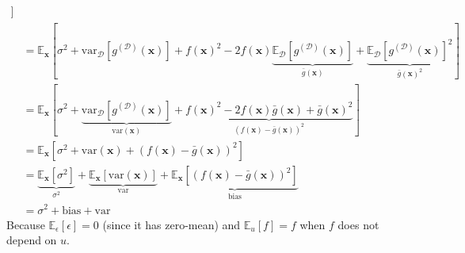\documentclass[12pt]{article}
\newcommand{\Data}{\mathcal{D}}
\newcommand{\Expect}{\mathbb{E}}
\newcommand{\Bias}{\bm{\mathrm{bias}}}
\newcommand{\Var}{\bm{\mathrm{var}}}
\newcommand{\myvec}[1]{\mathbf{#1}}
\newcommand{\X}{\myvec{x}}
\newcommand{\gD}{g^{(\Data)}}
\begin{document}
\begin{enumerate}
\begin{align*}
    [
    \underbrace{\Expect_{\Data}[f(\X)^{2}]}_{f(\X)^{2}}
    +
    \underbrace{\Expect_{\Data}[\sigma^{2}]}_{\sigma^{2}}
    +
    \underbrace{\Expect_{\Data}[\gD(\X)^{2}]}
    _{\substack{\Var_{\Data}[\gD(\X)] \\[0.5ex] + \\[0.5ex] \Expect_{\Data}[\gD(\X)]^{2}}}
    -
        \underbrace{\Expect_{\Data}[2f(\X)]}_{2f(\X)}
            \cdot
        \Expect_{\Data}[\gD(\X)]
    ]
    \\
    &= \Expect_{\X}
    [
    \sigma^{2} + \Var_{\Data}[\gD(\X)]
    + f(\X)^{2} - 2f(\X)\underbrace{\Expect_{\Data}[\gD(\X)]}_{\bar{g}(\X)} + \underbrace{\Expect_{\Data}[\gD(\X)]^{2}}_{\bar{g}(\X)^{2}}
    ]
    \\
    &= \Expect_{\X}
    [
    \sigma^{2} + \underbrace{\Var_{\Data}[\gD(\X)]}_{\Var(\X)}
    + 
    \underbrace
    {f(\X)^{2} - 2f(\X)\bar{g}(\X) + \bar{g}(\X)^{2}}
    _{( f(\X) - \bar{g}(\X))^{2}}
    ]
    \\
    &= \Expect_{\X}
    [
    \sigma^{2} + \Var(\X) + (f(\X) - \bar{g}(\X))^{2}
    ]
    \\
    &=
    \underbrace
    {\Expect_{\X}[\sigma^{2}]}_{\sigma^{2}}
    +
    \underbrace
    {\Expect_{\X}[\Var(\X)]}_{\Var}
    + 
    \underbrace
    {\Expect_{\X}[(f(\X) - \bar{g}(\X))^{2}]}_{\Bias}
    \\
    &= \sigma^{2} + \Bias + \Var
\end{align*}
Because $\Expect_{\epsilon}[\epsilon] = 0$ (since it has zero-mean) and $\Expect_{u}[f] = f$ when $f$ does not depend on $u$.
\end{enumerate}

\pagebreak
\end{document}
